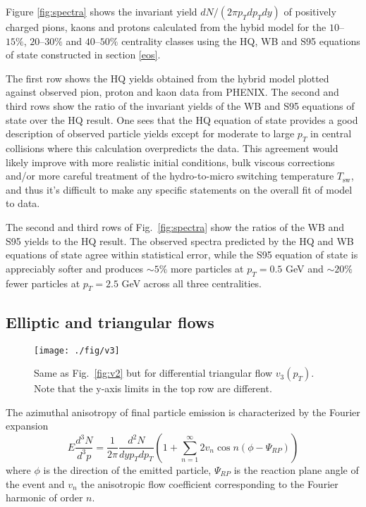 \documentclass[aps,prc,reprint,amsmath,nofootinbib,superscriptaddress]{revtex4-1}
\begin{document}
Figure \ref{fig:spectra} shows the invariant yield $dN/(2\pi p_T dp_T dy)$ of positively charged pions, kaons and protons calculated from the hybid model for the $10$--$15\%$, $20$--$30\%$
and $40$--$50\%$ centrality classes using the HQ, WB and S95 equations of state constructed in section \ref{eos}. 

The first row shows the HQ yields obtained from the hybrid model plotted against observed pion, proton and kaon data from PHENIX. The second and third rows show the ratio of the invariant yields of the WB and S95 equations of state over the HQ result. One sees that the HQ equation of state provides a good description of observed particle yields except for moderate to large $p_T$ in central collisions where this calculation overpredicts the data. This agreement would likely improve with more realistic initial conditions, bulk viscous corrections and/or more careful treatment of the hydro-to-micro switching temperature $T_\text{sw}$, and thus it's difficult to make any specific statements on the overall fit of model to data. 

The second and third rows of Fig.~\ref{fig:spectra} show the ratios of the WB and S95 yields to the HQ result. The observed spectra predicted by the HQ and WB equations of state agree within statistical error, while the S95 equation of state is appreciably softer and produces $\sim\!5\%$ more particles at $p_T = 0.5$ GeV and $\sim\!20\%$ fewer particles at $p_T=2.5$ GeV across all three centralities.

\subsection{Elliptic and triangular flows}
\label{flow}

\begin{figure*}[t]
  \texttt{[image: ./fig/v3]}
  \caption{
    \label{fig:v3} Same as Fig.~\ref{fig:v2} but for differential triangular flow $v_3(p_T)$. Note that the y-axis limits in the top row are different.
  }
\end{figure*}

The azimuthal anisotropy of final particle emission is characterized by the Fourier expansion
\begin{equation}
 E \frac{d^3N}{d^3p} = \frac{1}{2\pi} \frac{d^2N}{dy p_T dp_T} \left(1 + \sum\limits_{n=1}^\infty 2 v_n \cos n(\phi - \Psi_{RP}) \right)
\end{equation}
where $\phi$ is the direction of the emitted particle, $\Psi_{RP}$ is the reaction plane angle of the event and $v_n$ the anisotropic flow coefficient corresponding to the Fourier harmonic of order $n$.
\end{document}
